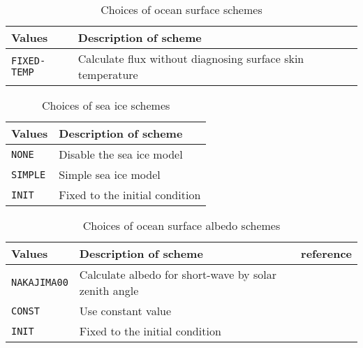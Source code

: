 \begin{table}[h]
\begin{center}
  \caption{Choices of ocean surface schemes}
  \label{tab:nml_ocean_sfc}
  \begin{tabularx}{150mm}{lX} \hline
    \rowcolor[gray]{0.9}  Values & Description of scheme \\ \hline
      \verb|FIXED-TEMP| & Calculate flux without diagnosing surface skin temperature \\
    \hline
  \end{tabularx}
\end{center}
\end{table}

\begin{table}[h]
\begin{center}
  \caption{Choices of sea ice schemes}
  \label{tab:nml_ocean_ice}
  \begin{tabularx}{150mm}{lX} \hline
    \rowcolor[gray]{0.9}  Values & Description of scheme \\ \hline
      \verb|NONE|   & Disable the sea ice model \\
      \verb|SIMPLE| & Simple sea ice model \\
      \verb|INIT|   & Fixed to the initial condition \\
    \hline
  \end{tabularx}
\end{center}
\end{table}

\begin{table}[h]
\begin{center}
  \caption{Choices of ocean surface albedo schemes}
  \label{tab:nml_ocean_alb}
  \begin{tabularx}{150mm}{llX} \hline
    \rowcolor[gray]{0.9}  Values & Description of scheme & reference \\ \hline
      \verb|NAKAJIMA00| & Calculate albedo for short-wave by solar zenith angle & \citet{nakajima_2000} \\
      \verb|CONST|      & Use constant value \\
      \verb|INIT|       & Fixed to the initial condition \\
    \hline
  \end{tabularx}
\end{center}
\end{table}


